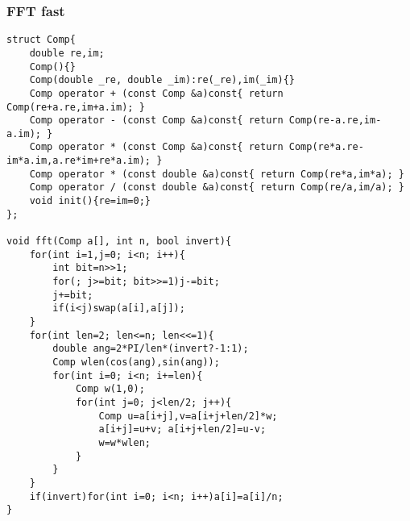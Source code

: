\subsubsection{FFT fast}
\begin{verbatim}
struct Comp{
    double re,im;
    Comp(){}
    Comp(double _re, double _im):re(_re),im(_im){}
    Comp operator + (const Comp &a)const{ return Comp(re+a.re,im+a.im); }
    Comp operator - (const Comp &a)const{ return Comp(re-a.re,im-a.im); }
    Comp operator * (const Comp &a)const{ return Comp(re*a.re-im*a.im,a.re*im+re*a.im); }
    Comp operator * (const double &a)const{ return Comp(re*a,im*a); }
    Comp operator / (const double &a)const{ return Comp(re/a,im/a); }
    void init(){re=im=0;}
};

void fft(Comp a[], int n, bool invert){
    for(int i=1,j=0; i<n; i++){
        int bit=n>>1;
        for(; j>=bit; bit>>=1)j-=bit;
        j+=bit;
        if(i<j)swap(a[i],a[j]);
    }
    for(int len=2; len<=n; len<<=1){
        double ang=2*PI/len*(invert?-1:1);
        Comp wlen(cos(ang),sin(ang));
        for(int i=0; i<n; i+=len){
            Comp w(1,0);
            for(int j=0; j<len/2; j++){
                Comp u=a[i+j],v=a[i+j+len/2]*w;
                a[i+j]=u+v; a[i+j+len/2]=u-v; 
                w=w*wlen;
            }
        }
    }
    if(invert)for(int i=0; i<n; i++)a[i]=a[i]/n;
}
\end{verbatim}
